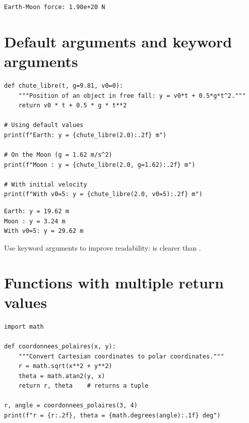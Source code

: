 \begin{codeoutput}
\begin{verbatim}
Earth-Moon force: 1.98e+20 N
\end{verbatim}
\end{codeoutput}

\section{Default arguments and keyword arguments}

\begin{codeblock}[title=\textbf{Python}]
\begin{verbatim}
def chute_libre(t, g=9.81, v0=0):
    """Position of an object in free fall: y = v0*t + 0.5*g*t^2."""
    return v0 * t + 0.5 * g * t**2

# Using default values
print(f"Earth: y = {chute_libre(2.0):.2f} m")

# On the Moon (g = 1.62 m/s^2)
print(f"Moon : y = {chute_libre(2.0, g=1.62):.2f} m")

# With initial velocity
print(f"With v0=5: y = {chute_libre(2.0, v0=5):.2f} m")
\end{verbatim}
\end{codeblock}

\begin{codeoutput}
\begin{verbatim}
Earth: y = 19.62 m
Moon : y = 3.24 m
With v0=5: y = 29.62 m
\end{verbatim}
\end{codeoutput}

\begin{bestpractice}
Use keyword arguments to improve readability:
 is clearer than .
\end{bestpractice}

\section{Functions with multiple return values}

\begin{codeblock}[title=\textbf{Python}]
\begin{verbatim}
import math

def coordonnees_polaires(x, y):
    """Convert Cartesian coordinates to polar coordinates."""
    r = math.sqrt(x**2 + y**2)
    theta = math.atan2(y, x)
    return r, theta    # returns a tuple

r, angle = coordonnees_polaires(3, 4)
print(f"r = {r:.2f}, theta = {math.degrees(angle):.1f} deg")
\end{verbatim}
\end{codeblock}

